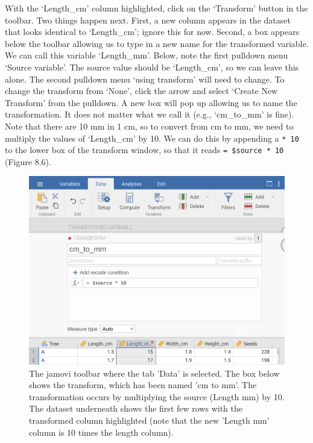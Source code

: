 \documentclass[
  openany]{krantz}
\begin{document}
With the `Length\_cm' column highlighted, click on the `Transform' button in the toolbar.
Two things happen next.
First, a new column appears in the dataset that looks identical to `Length\_cm'; ignore this for now.
Second, a box appears below the toolbar allowing us to type in a new name for the transformed variable.
We can call this variable `Length\_mm'.
Below, note the first pulldown menu `Source variable'.
The source value should be `Length\_cm', so we can leave this alone.
The second pulldown menu `using transform' will need to change.
To change the transform from `None', click the arrow and select `Create New Transform' from the pulldown.
A new box will pop up allowing us to name the transformation.
It does not matter what we call it (e.g., `cm\_to\_mm' is fine).
Note that there are 10 mm in 1 cm, so to convert from cm to mm, we need to multiply the values of `Length\_cm' by 10.
We can do this by appending a \texttt{*\ 10} to the lower box of the transform window, so that it reads \texttt{=\ \$source\ *\ 10} (Figure 8.6).

\begin{figure}
\includegraphics[width=1\linewidth]{img/jamovi_transform_cm_to_mm} \caption{The jamovi toolbar where the tab 'Data' is selected. The box below shows the transform, which has been named 'cm to mm'. The transformation occurs by multiplying the source (Length mm) by 10. The dataset underneath shows the first few rows with the transformed column highlighted (note that the new 'Length mm' column is 10 times the length column).}\label{fig:unnamed-chunk-30}
\end{figure}
\end{document}
